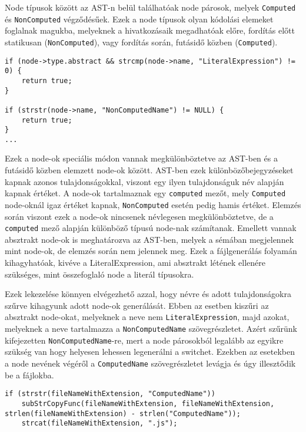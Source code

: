 Node típusok között az AST-n belül találhatóak node párosok, melyek \texttt{Computed} és \texttt{NonComputed} végződésűek. Ezek a node típusok olyan kódolási elemeket foglalnak magukba, melyeknek a hivatkozásaik megadhatóak előre, fordítás előtt statikusan (\texttt{NonComputed}), vagy fordítás során, futásidő közben (\texttt{Computed}).

\pagebreak

\begin{lstlisting}[caption={Absztrakt és speciális node szűrés},label={lst:abs-computedfiltering}, style={CStyle}]
if (node->type.abstract && strcmp(node->name, "LiteralExpression") != 0) {
    return true;
}

if (strstr(node->name, "NonComputedName") != NULL) {
    return true;
}
...
\end{lstlisting}

Ezek a node-ok speciális módon vannak megkülönböztetve az AST-ben és a futásidő közben elemzett node-ok között. AST-ben ezek különbözőbejegyzéseket kapnak azonos tulajdonságokkal, viszont egy ilyen tulajdonságuk név alapján kapnak értéket. A node-ok tartalmaznak egy \texttt{computed} mezőt, mely \texttt{Computed} node-oknál igaz értéket kapnak, \texttt{NonComputed} esetén pedig hamis értéket. Elemzés során viszont ezek a node-ok nincsenek névlegesen megkülönböztetve, de a \texttt{computed} mező alapján különböző típusú node-nak számítanak.
Emellett vannak absztrakt node-ok is meghatározva az AST-ben, melyek a sémában megjelennek mint node-ok, de elemzés során nem jelennek meg. Ezek a fájlgenerálás folyamán kihagyhatóak, kivéve a LiteralExpression, ami absztrakt létének ellenére szükséges, mint összefoglaló node a literál típusokra.

Ezek lekezelése könnyen elvégezhető azzal, hogy névre és adott tulajdonságokra szűrve kihagyunk adott node-ok generálását. 
Ebben az esetben kiszűri az absztrakt node-okat, melyeknek a neve nem \texttt{LiteralExpression}, majd azokat, melyeknek a neve tartalmazza a \texttt{NonComputedName} szövegrészletet. Azért szűrünk kifejezetten \texttt{NonComputedName}-re, mert a node párosokból legalább az egyikre szükség van hogy helyesen lehessen legenerálni a switchet. Ezekben az esetekben a node nevének végéről a \texttt{ComputedName} szövegrészletet levágja és úgy illesztődik be a fájlokba.

\begin{lstlisting}[caption={Computed és NonComputed node-ok kezelése},label={lst:abs-compnoncomp}, style={CStyle}]
if (strstr(fileNameWithExtension, "ComputedName")) 
    subStrCopyFunc(fileNameWithExtension, fileNameWithExtension, strlen(fileNameWithExtension) - strlen("ComputedName"));
    strcat(fileNameWithExtension, ".js");
\end{lstlisting}


